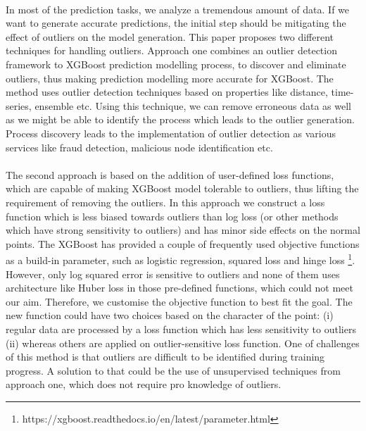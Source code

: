 \documentclass[runningheads]{llncs}
\begin{document}
\paragraph{} In most of the prediction tasks, we analyze a tremendous amount of data. If we want to generate accurate predictions, the initial step should be mitigating the effect of outliers on the model generation. This paper proposes two different techniques for handling outliers. Approach one combines an outlier detection framework to XGBoost prediction modelling process, to discover and eliminate outliers, thus making prediction modelling more accurate for XGBoost. The method uses outlier detection techniques based on properties like distance, time-series, ensemble etc. Using this technique, we can remove erroneous data as well as we might be able to identify the process which leads to the outlier generation. Process discovery leads to the implementation of outlier detection as various services like fraud detection, malicious node identification etc. 

\paragraph{} The second approach is based on the addition of user-defined loss functions, which are capable of making XGBoost model tolerable to outliers, thus lifting the requirement of removing the outliers. In this approach we construct a loss function which is less biased towards outliers than log loss (or other methods which have strong sensitivity to outliers) and has minor side effects on the normal points. The XGBoost has provided a couple of frequently used objective functions as a build-in parameter, such as logistic regression, squared loss and hinge loss \footnote{https://xgboost.readthedocs.io/en/latest/parameter.html}. However, only log squared error is sensitive to outliers and none of them uses architecture like Huber loss in those pre-defined functions, which could not meet our aim. Therefore, we customise the objective function to best fit the goal. The new function could have two choices based on the character of the point: (i) regular data are processed by a loss function which has less sensitivity to outliers (ii) whereas others are applied on outlier-sensitive loss function. One of challenges of this method is that outliers are difficult to be identified during training progress. A solution to that could be the use of unsupervised techniques from approach one, which does not require pro knowledge of outliers.
\end{document}

